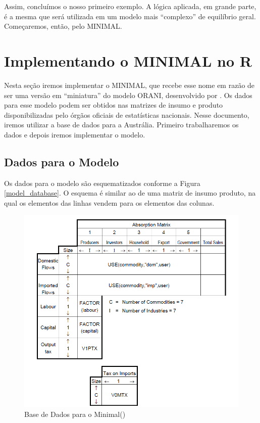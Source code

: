 \documentclass[12pt,twoside]{article}
\begin{document}
Assim, concluímos o nosso primeiro exemplo. A lógica aplicada, em grande
parte, é a mesma que será utilizada em um modelo mais ``complexo'' de
equilíbrio geral. Começaremos, então, pelo MINIMAL.

\hypertarget{implementando-o-minimal-no-r}{%
\section{Implementando o MINIMAL no
R}\label{implementando-o-minimal-no-r}}

Nesta seção iremos implementar o MINIMAL, que recebe esse nome em razão
de ser uma versão em ``miniatura'' do modelo ORANI, desenvolvido por
\cite{horridge_2000}. Os dados para esse modelo podem ser obtidos nas
matrizes de insumo e produto disponibilizadas pelo órgãos oficiais de
estatísticas nacionais. Nesse documento, iremos utilizar a base de dados
para a Austrália. Primeiro trabalharemos os dados e depois iremos
implementar o modelo.

\hypertarget{dados-para-o-modelo}{%
\subsection{Dados para o Modelo}\label{dados-para-o-modelo}}

Os dados para o modelo são esquematizados conforme a Figura
\ref{model_database}. O esquema é similar ao de uma matriz de insumo
produto, na qual os elementos das linhas vendem para os elementos das
colunas.

\begin{figure}[h]

{\centering \includegraphics[width=5.55in]{minimal_database} 

}

\caption{Base de Dados para o Minimal(\cite{horridge_2001}\label{model_database})}\label{fig:unnamed-chunk-12}
\end{figure}
\end{document}
